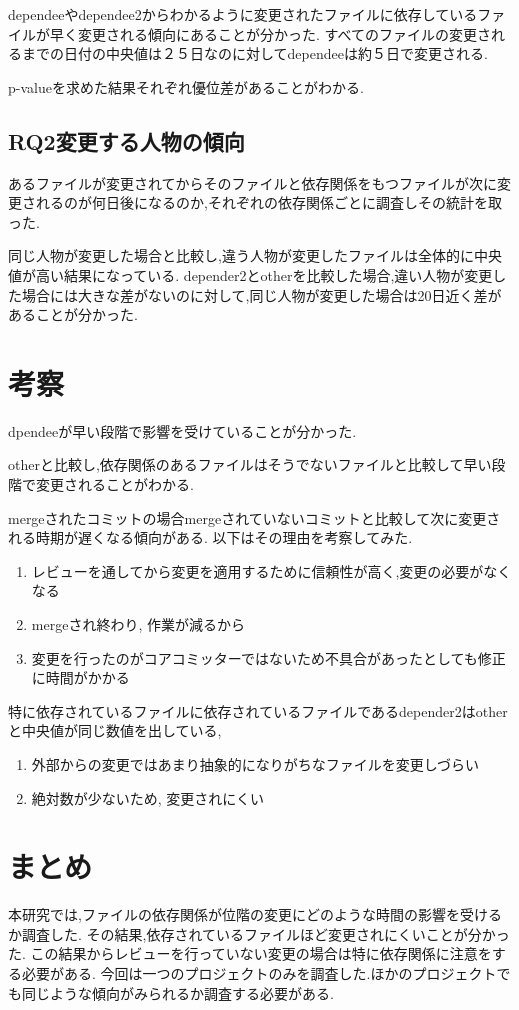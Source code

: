 \documentclass{jsarticle}
\begin{document}
dependeeやdependee2からわかるように変更されたファイルに依存しているファイルが早く変更される傾向にあることが分かった.
すべてのファイルの変更されるまでの日付の中央値は２５日なのに対してdependeeは約５日で変更される.

p-valueを求めた結果それぞれ優位差があることがわかる.


\subsection{RQ2変更する人物の傾向}
あるファイルが変更されてからそのファイルと依存関係をもつファイルが次に変更されるのが何日後になるのか,それぞれの依存関係ごとに調査しその統計を取った.

同じ人物が変更した場合と比較し,違う人物が変更したファイルは全体的に中央値が高い結果になっている.
depender2とotherを比較した場合,違い人物が変更した場合には大きな差がないのに対して,同じ人物が変更した場合は20日近く差があることが分かった.



\section{考察}
dpendeeが早い段階で影響を受けていることが分かった.

otherと比較し,依存関係のあるファイルはそうでないファイルと比較して早い段階で変更されることがわかる.

mergeされたコミットの場合mergeされていないコミットと比較して次に変更される時期が遅くなる傾向がある.
以下はその理由を考察してみた.
\begin{enumerate}
\item レビューを通してから変更を適用するために信頼性が高く,変更の必要がなくなる
\item mergeされ終わり, 作業が減るから
\item 変更を行ったのがコアコミッターではないため不具合があったとしても修正に時間がかかる
\end{enumerate}

特に依存されているファイルに依存されているファイルであるdepender2はotherと中央値が同じ数値を出している,
\begin{enumerate}
\item 外部からの変更ではあまり抽象的になりがちなファイルを変更しづらい
\item 絶対数が少ないため, 変更されにくい
\end{enumerate}



\section{まとめ} 
本研究では,ファイルの依存関係が位階の変更にどのような時間の影響を受けるか調査した.
その結果,依存されているファイルほど変更されにくいことが分かった.
この結果からレビューを行っていない変更の場合は特に依存関係に注意をする必要がある.
今回は一つのプロジェクトのみを調査した.ほかのプロジェクトでも同じような傾向がみられるか調査する必要がある.
\end{document}
